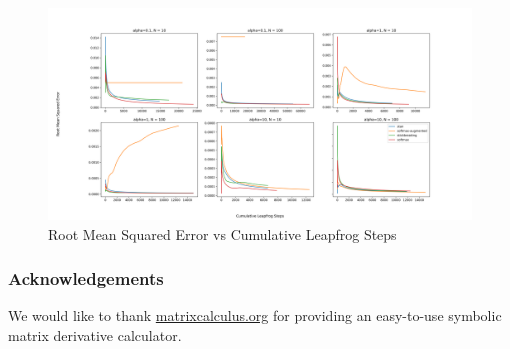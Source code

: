 \documentclass[11pt]{article}
\begin{document}
\begin{figure}
    \centering
    \includegraphics[width=1.2\textwidth]{figures/rmse.png}
    \caption{Root Mean Squared Error vs Cumulative Leapfrog Steps}
    \label{fig:rmse}
\end{figure}

\subsubsection*{Acknowledgements}

We would like to thank \url{matrixcalculus.org} for providing an
easy-to-use symbolic matrix derivative calculator.



{}

\end{document}
